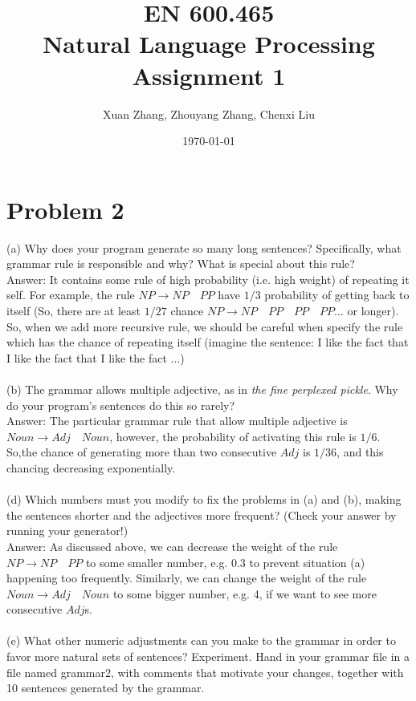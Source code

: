 \documentclass[a4paper, 11pt]{article}
\begin{document}
\date{\today}
\author{Xuan Zhang, Zhouyang Zhang, Chenxi Liu }
\title{\textbf{EN 600.465 \\Natural Language Processing\\Assignment 1\\ }}

\maketitle
\section{Problem 2}
(a) Why does your program generate so many long sentences? Specifically, what grammar rule is responsible and why? What is special about this rule?\\
Answer: It contains some rule of high probability (i.e. high weight) of repeating it self. For example, the rule $NP \to NP\quad PP$ have $1/3$ probability of getting back to itself (So, there are at least $1/27$ chance $NP \to NP \quad PP \quad PP \quad PP \ldots $ or longer). So, when we add more recursive rule, we should be careful when specify the rule which has the chance of repeating itself (imagine the sentence: I like the fact that I like the fact that I like the fact ...)\\
\\
(b) The grammar allows multiple adjective, as in \textit{the fine perplexed pickle}. Why do your program's sentences do this so rarely? \\
Answer: The particular grammar rule that allow multiple adjective is $Noun \to Adj \quad Noun$, however, the probability of activating this rule is $1/6$. So,the chance of generating more than two consecutive $Adj$ is $1/36$, and this chancing decreasing exponentially.\\
\\
(d) Which  numbers  must  you  modify  to  fix  the  problems  in  (a)  and  (b),  making  the  sentences shorter and the adjectives more frequent? (Check your answer by running your generator!) \\
Answer: As discussed above, we can decrease the weight of the rule $NP \to NP\quad PP$ to some smaller number, e.g. 0.3 to prevent situation (a) happening too frequently. Similarly, we can change the weight of the rule $Noun \to Adj \quad Noun$ to some bigger number, e.g. 4, if we want to see more consecutive $Adj$s.\\
\\
(e) What other numeric adjustments can you make to the grammar in order to favor more natural sets of sentences?  Experiment.  Hand in your grammar file in a file named grammar2, with comments that motivate your changes, together with 10 sentences generated by the grammar. \\
\end{document}
